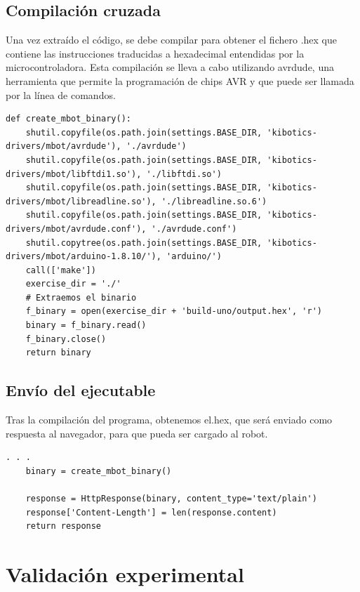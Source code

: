 \documentclass{report}
\begin{document}
\subsection{Compilación cruzada}

Una vez extraído el código, se debe compilar para obtener el fichero .hex que contiene las instrucciones traducidas a hexadecimal entendidas por la microcontroladora. Esta compilación se lleva a cabo utilizando avrdude, una herramienta que permite la programación de chips AVR y que puede ser llamada por la línea de comandos.
\\
\begin{lstlisting}[frame=single,breaklines=true, label=Compilado y obtención del .hex, caption=Compilado y obtención del .hex, captionpos=b]
def create_mbot_binary():
    shutil.copyfile(os.path.join(settings.BASE_DIR, 'kibotics-drivers/mbot/avrdude'), './avrdude')
    shutil.copyfile(os.path.join(settings.BASE_DIR, 'kibotics-drivers/mbot/libftdi1.so'), './libftdi.so')
    shutil.copyfile(os.path.join(settings.BASE_DIR, 'kibotics-drivers/mbot/libreadline.so'), './libreadline.so.6')
    shutil.copyfile(os.path.join(settings.BASE_DIR, 'kibotics-drivers/mbot/avrdude.conf'), './avrdude.conf')
    shutil.copytree(os.path.join(settings.BASE_DIR, 'kibotics-drivers/mbot/arduino-1.8.10/'), 'arduino/')
    call(['make'])
    exercise_dir = './'
    # Extraemos el binario
    f_binary = open(exercise_dir + 'build-uno/output.hex', 'r')
    binary = f_binary.read()
    f_binary.close()
    return binary
\end{lstlisting}

\subsection{Envío del ejecutable}

Tras la compilación del programa, obtenemos el.hex, que será enviado como respuesta al navegador, para que pueda ser cargado al robot.
\\
\begin{lstlisting}[frame=single,breaklines=true, label=Respuesta a la petición que envió el navegador, caption=Respuesta a la petición que envió el navegador, captionpos=b]
    . . .
    binary = create_mbot_binary()

    response = HttpResponse(binary, content_type='text/plain')
    response['Content-Length'] = len(response.content)
    return response
\end{lstlisting}

\section{Validación experimental}
\end{document}
